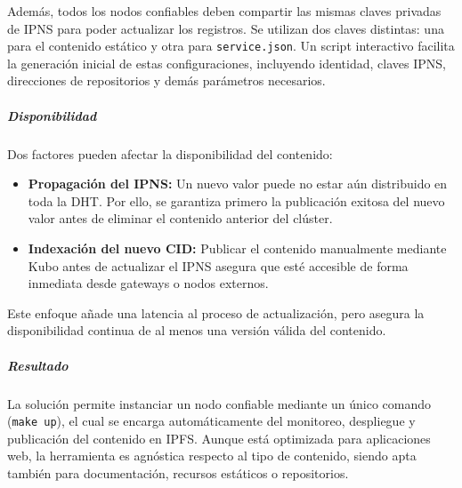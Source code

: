Además, todos los nodos confiables deben compartir las mismas claves privadas de IPNS para poder actualizar los registros. Se utilizan dos claves distintas: una para el contenido estático y otra para \texttt{service.json}. Un script interactivo facilita la generación inicial de estas configuraciones, incluyendo identidad, claves IPNS, direcciones de repositorios y demás parámetros necesarios.

\subparagraph{Disponibilidad} Dos factores pueden afectar la disponibilidad del contenido:

\begin{itemize}
    \item \textbf{Propagación del IPNS:} Un nuevo valor puede no estar aún distribuido en toda la DHT. Por ello, se garantiza primero la publicación exitosa del nuevo valor antes de eliminar el contenido anterior del clúster.
    \item \textbf{Indexación del nuevo CID:} Publicar el contenido manualmente mediante Kubo antes de actualizar el IPNS asegura que esté accesible de forma inmediata desde gateways o nodos externos.
\end{itemize}

Este enfoque añade una latencia al proceso de actualización, pero asegura la disponibilidad continua de al menos una versión válida del contenido.



\subparagraph{Resultado}

La solución permite instanciar un nodo confiable mediante un único comando (\texttt{make up}), el cual se encarga automáticamente del monitoreo, despliegue y publicación del contenido en IPFS. Aunque está optimizada para aplicaciones web, la herramienta es agnóstica respecto al tipo de contenido, siendo apta también para documentación, recursos estáticos o repositorios.

